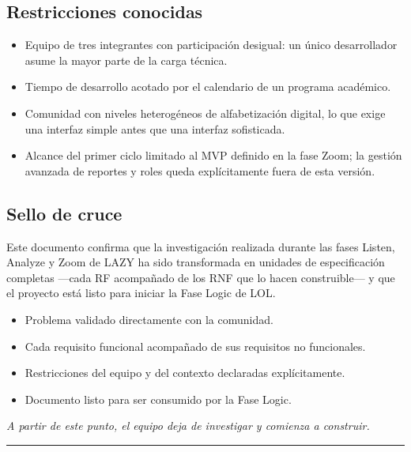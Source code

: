 \documentclass[14pt,a4paper,oneside]{extbook}
\begin{document}
\subsection{Restricciones conocidas}

\begin{itemize}
\item Equipo de tres integrantes con participación desigual: un único desarrollador asume la mayor parte de la carga técnica.
\item Tiempo de desarrollo acotado por el calendario de un programa académico.
\item Comunidad con niveles heterogéneos de alfabetización digital, lo que exige una interfaz simple antes que una interfaz sofisticada.
\item Alcance del primer ciclo limitado al MVP definido en la fase Zoom; la gestión avanzada de reportes y roles queda explícitamente fuera de esta versión.
\end{itemize}

\subsection{Sello de cruce}

\begin{bitacoraseal}
Este documento confirma que la investigación realizada durante las fases Listen, Analyze y Zoom de LAZY ha sido transformada en unidades de especificación completas —cada RF acompañado de los RNF que lo hacen construible— y que el proyecto está listo para iniciar la Fase Logic de LOL.

\medskip
\begin{itemize}
\item[\textcolor{accent}{\textbullet}] Problema validado directamente con la comunidad.
\item[\textcolor{accent}{\textbullet}] Cada requisito funcional acompañado de sus requisitos no funcionales.
\item[\textcolor{accent}{\textbullet}] Restricciones del equipo y del contexto declaradas explícitamente.
\item[\textcolor{accent}{\textbullet}] Documento listo para ser consumido por la Fase Logic.
\end{itemize}

\medskip
\textit{A partir de este punto, el equipo deja de investigar y comienza a construir.}
\end{bitacoraseal}

\par\vspace{1.5em}\noindent\hfill\rule{0.25\textwidth}{0.6pt}\hfill\par\vspace{1.5em}
\end{document}
